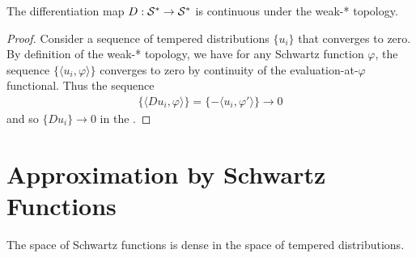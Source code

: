   \begin{claim}
    The differentiation map $D:\mathcal{S}^*\rightarrow\mathcal{S}^*$ is continuous under the weak-* topology.
  \end{claim}
  \begin{proof}
    Consider a sequence of tempered distributions $\{u_i\}$ that converges to zero.
    By definition of the weak-* topology, we have for any Schwartz function $\varphi$, the sequence $\{\langle u_i,\varphi\rangle\}$ converges to zero by continuity of the evaluation-at-$\varphi$ functional.
    Thus the sequence 
    \begin{align*}
      \{\langle Du_i, \varphi\rangle\} = \{-\langle u_i, \varphi'\rangle\} \rightarrow 0
    \end{align*}
    and so $\{Du_i\}\rightarrow 0$ in the \ws.
  \end{proof}

  \section{Approximation by Schwartz Functions}
    \begin{claim}
      The space of Schwartz functions is dense in the space of tempered distributions.
    \end{claim}


